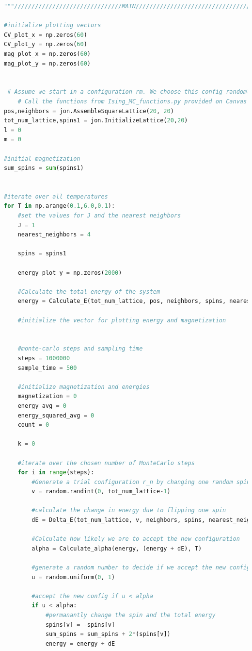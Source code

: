 \documentclass{article}
\begin{document}
\begin{lstlisting}[language=Python]
"""///////////////////////////////MAIN//////////////////////////////////////"""

#initialize plotting vectors
CV_plot_x = np.zeros(60)
CV_plot_y = np.zeros(60)
mag_plot_x = np.zeros(60)
mag_plot_y = np.zeros(60)


 # Assume we start in a configuration rm. We choose this config randomly. 
    # Call the functions from Ising_MC_functions.py provided on Canvas
pos,neighbors = jon.AssembleSquareLattice(20, 20)
tot_num_lattice,spins1 = jon.InitializeLattice(20,20)
l = 0
m = 0

#initial magnetization
sum_spins = sum(spins1)


#iterate over all temperatures
for T in np.arange(0.1,6.0,0.1):
    #set the values for J and the nearest neighbors
    J = 1
    nearest_neighbors = 4
    
    spins = spins1
   
    energy_plot_y = np.zeros(2000)
    
    #Calculate the total energy of the system
    energy = Calculate_E(tot_num_lattice, pos, neighbors, spins, nearest_neighbors, J)
    
    #initialize the vector for plotting energy and magnetization
    
    
    #monte-carlo steps and sampling time
    steps = 1000000
    sample_time = 500
    
    #initialize magnetization and energies
    magnetization = 0
    energy_avg = 0
    energy_squared_avg = 0
    count = 0
    
    k = 0
    
    #iterate over the chosen number of MonteCarlo steps
    for i in range(steps):
        #Generate a trial configuration r_n by changing one random spin
        v = random.randint(0, tot_num_lattice-1)
        
        #calculate the change in energy due to flipping one spin
        dE = Delta_E(tot_num_lattice, v, neighbors, spins, nearest_neighbors, J)
    
        #Calculate how likely we are to accept the new configuration
        alpha = Calculate_alpha(energy, (energy + dE), T)
        
        #generate a random number to decide if we accept the new config
        u = random.uniform(0, 1)
        
        #accept the new config if u < alpha
        if u < alpha:
            #permanantly change the spin and the total energy
            spins[v] = -spins[v]
            sum_spins = sum_spins + 2*(spins[v])
            energy = energy + dE
            

\end{lstlisting}
\end{document}

